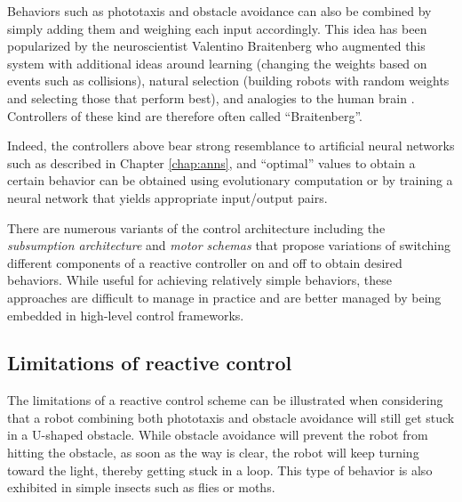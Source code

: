 Behaviors such as phototaxis and obstacle avoidance can also be combined by simply adding them and weighing each input accordingly. This idea has been popularized by the neuroscientist Valentino Braitenberg who augmented this system with additional ideas around learning (changing the weights based on events such as collisions), natural selection (building robots with random weights and selecting those that perform best), and analogies to the human brain \cite{braitenberg1986vehicles}. Controllers of these kind are therefore often called ``Braitenberg''.

Indeed, the controllers above bear strong resemblance to artificial neural networks such as described in Chapter \ref{chap:anns}, and ``optimal'' values to obtain a certain behavior can be obtained using evolutionary computation \cite{floreano1998evolutionary} or by training a neural network that yields appropriate input/output pairs. 

There are numerous variants of the control architecture including the \emph{subsumption architecture} \cite{brooks1990elephants} and \emph{motor schemas} \cite{arkin1989motor} that propose variations of switching different components of a reactive controller on and off to obtain desired behaviors. While useful for achieving relatively simple behaviors, these approaches are difficult to manage in practice and are better managed by being embedded in high-level control frameworks. 

\subsection{Limitations of reactive control}
The limitations of a reactive control scheme can be illustrated when considering that a robot combining both phototaxis and obstacle avoidance will still get stuck in a U-shaped obstacle. While obstacle avoidance will prevent the robot from hitting the obstacle, as soon as the way is clear, the robot will keep turning toward the light, thereby getting stuck in a loop. This type of behavior is also exhibited in simple insects such as flies or moths.

